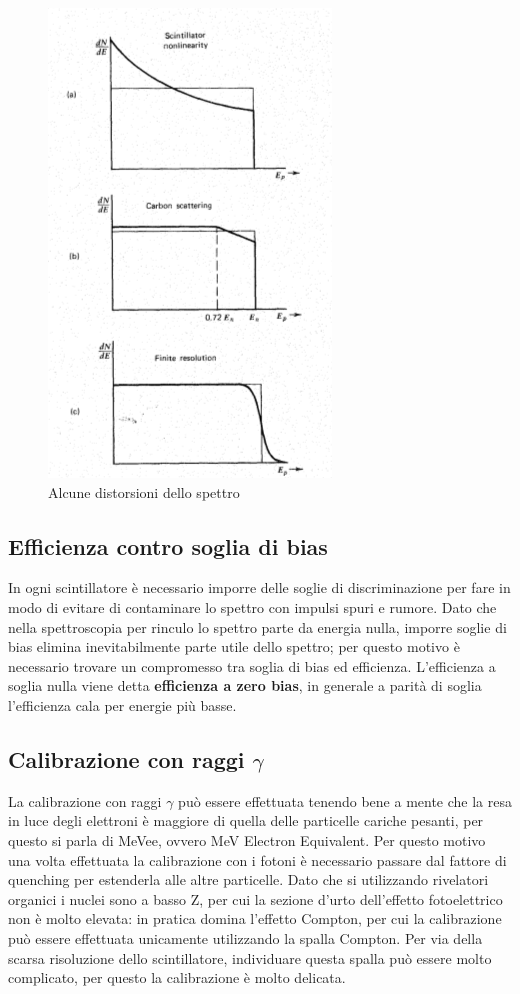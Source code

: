 \begin{figure}[htbp]
\begin{center}
\includegraphics[scale=0.75]{./Immagini/DistorsioniNeutroni.png}
\caption{Alcune distorsioni dello spettro}
\label{fig:distorsioniNeutroni}
\end{center}
\end{figure}
\subsection{Efficienza contro soglia di bias}
In ogni scintillatore \`e necessario imporre delle soglie di discriminazione per fare in modo di evitare di contaminare lo spettro
con impulsi spuri e rumore.
Dato che nella spettroscopia per rinculo lo spettro parte da energia nulla, imporre soglie di bias elimina inevitabilmente parte utile dello spettro;
per questo motivo \`e necessario trovare un compromesso tra soglia di bias ed efficienza.
L'efficienza a soglia nulla viene detta \textbf{efficienza a zero bias}, in generale a parit\`a di soglia l'efficienza cala per energie pi\`u basse.
\subsection{Calibrazione con raggi $\gamma$}
La calibrazione con raggi $\gamma$ pu\`o essere effettuata tenendo bene a mente che la resa in luce degli elettroni \`e maggiore di quella delle
particelle cariche pesanti, per questo si parla di MeVee, ovvero MeV Electron Equivalent.
Per questo motivo una volta effettuata la calibrazione con i fotoni \`e necessario passare dal fattore di quenching per estenderla alle altre particelle.
Dato che si utilizzando rivelatori organici i nuclei sono a basso Z, per cui la sezione d'urto dell'effetto fotoelettrico non \`e molto elevata:
in pratica domina l'effetto Compton, per cui la calibrazione pu\`o essere effettuata unicamente utilizzando la spalla Compton.
Per via della scarsa risoluzione dello scintillatore, individuare questa spalla pu\`o essere molto complicato, per questo la calibrazione \`e molto delicata.
